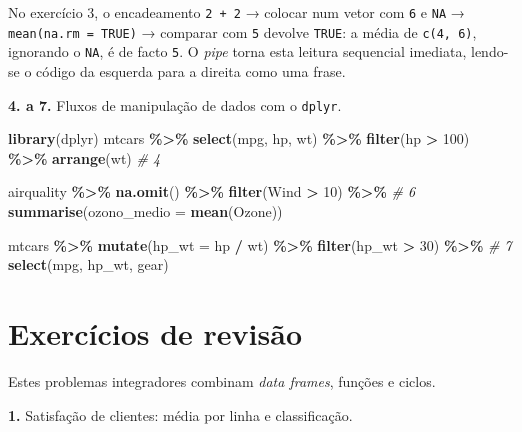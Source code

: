 \documentclass[
  portuguese,
  11pt,
  openany]{book}
\newenvironment{Shaded}{\begin{snugshade}}{\end{snugshade}}
\newcommand{\AttributeTok}[1]{\textcolor[rgb]{0.13,0.29,0.53}{#1}}
\newcommand{\CommentTok}[1]{\textcolor[rgb]{0.56,0.35,0.01}{\textit{#1}}}
\newcommand{\DecValTok}[1]{\textcolor[rgb]{0.00,0.00,0.81}{#1}}
\newcommand{\FunctionTok}[1]{\textcolor[rgb]{0.13,0.29,0.53}{\textbf{#1}}}
\newcommand{\NormalTok}[1]{#1}
\newcommand{\SpecialCharTok}[1]{\textcolor[rgb]{0.81,0.36,0.00}{\textbf{#1}}}
\begin{document}
No exercício 3, o encadeamento \texttt{2\ +\ 2} → colocar num vetor com \texttt{6} e \texttt{NA} →
\texttt{mean(na.rm\ =\ TRUE)} → comparar com \texttt{5} devolve \texttt{TRUE}: a média de \texttt{c(4,\ 6)},
ignorando o \texttt{NA}, é de facto \texttt{5}. O \emph{pipe} torna esta leitura sequencial
imediata, lendo-se o código da esquerda para a direita como uma frase.

\textbf{4. a 7.} Fluxos de manipulação de dados com o \texttt{dplyr}.

\begin{Shaded}
\begin{Highlighting}[]
\FunctionTok{library}\NormalTok{(dplyr)}
\NormalTok{mtcars }\SpecialCharTok{\%\textgreater{}\%} \FunctionTok{select}\NormalTok{(mpg, hp, wt) }\SpecialCharTok{\%\textgreater{}\%} \FunctionTok{filter}\NormalTok{(hp }\SpecialCharTok{\textgreater{}} \DecValTok{100}\NormalTok{) }\SpecialCharTok{\%\textgreater{}\%} \FunctionTok{arrange}\NormalTok{(wt)   }\CommentTok{\# 4}

\NormalTok{airquality }\SpecialCharTok{\%\textgreater{}\%} \FunctionTok{na.omit}\NormalTok{() }\SpecialCharTok{\%\textgreater{}\%} \FunctionTok{filter}\NormalTok{(Wind }\SpecialCharTok{\textgreater{}} \DecValTok{10}\NormalTok{) }\SpecialCharTok{\%\textgreater{}\%}                    \CommentTok{\# 6}
  \FunctionTok{summarise}\NormalTok{(}\AttributeTok{ozono\_medio =} \FunctionTok{mean}\NormalTok{(Ozone))}

\NormalTok{mtcars }\SpecialCharTok{\%\textgreater{}\%} \FunctionTok{mutate}\NormalTok{(}\AttributeTok{hp\_wt =}\NormalTok{ hp }\SpecialCharTok{/}\NormalTok{ wt) }\SpecialCharTok{\%\textgreater{}\%} \FunctionTok{filter}\NormalTok{(hp\_wt }\SpecialCharTok{\textgreater{}} \DecValTok{30}\NormalTok{) }\SpecialCharTok{\%\textgreater{}\%}         \CommentTok{\# 7}
  \FunctionTok{select}\NormalTok{(mpg, hp\_wt, gear)}
\end{Highlighting}
\end{Shaded}

\section{Exercícios de revisão}\label{exercuxedcios-de-revisuxe3o}

Estes problemas integradores combinam \emph{data frames}, funções e ciclos.

\textbf{1.} Satisfação de clientes: média por linha e classificação.
\end{document}
